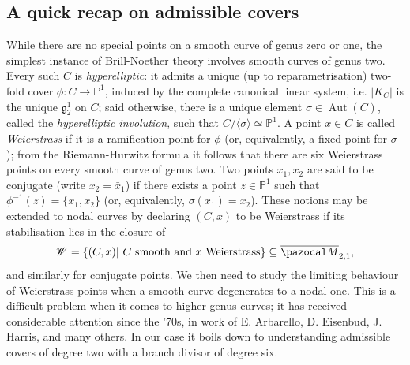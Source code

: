 \documentclass{compositio}
\newcommand{\PP}{\mathbb P}
\renewcommand{\to}{\rightarrow}
\newcommand{\oM}{\overline{\pazocal M}}
\newcommand{\Aut}{\operatorname{Aut}}
\theoremstyle{plain}
\theoremstyle{definition}
\theoremstyle{remark}
\begin{document}
\subsection{A quick recap on admissible covers}\label{rmk:Wandconj}
 While there are no special points on a smooth curve of genus zero or one, the simplest instance of Brill-Noether theory involves smooth curves of genus two. Every such $C$ is \emph{hyperelliptic}: it admits a unique (up to reparametrisation) two-fold cover $\phi\colon C\to\PP^1$, induced by the complete canonical linear system, i.e. $\lvert K_C\rvert$ is the unique $\mathfrak g^1_2$ on $C$; said otherwise, there is a unique element $\sigma\in\Aut(C)$, called the \emph{hyperelliptic involution}, such that $C/\langle\sigma\rangle\simeq\PP^1$. A point $x\in C$ is called \emph{Weierstrass} if it is a ramification point for $\phi$ (or, equivalently, a fixed point for $\sigma$); from the Riemann-Hurwitz formula it follows that there are six Weierstrass points on every smooth curve of genus two. Two points $x_1,x_2$ are said to be conjugate (write $x_2=\bar x_1$) if there exists a point $z\in\PP^1$ such that $\phi^{-1}(z)=\{x_1,x_2\}$ (or, equivalently, $\sigma(x_1)=x_2$). These notions may be extended to nodal curves by declaring $(C,x)$ to be Weierstrass if its stabilisation lies in the closure of
 \[\mathcal W=\{(C,x)|\ C\text{ smooth and } x \text{ Weierstrass}\}\subseteq\oM_{2,1},\]
 and similarly for conjugate points. We then need to study the limiting behaviour of Weierstrass points when a smooth curve degenerates to a nodal one. This is a difficult problem when it comes to higher genus curves; it has received considerable attention since the '70s, in work of E. Arbarello, D. Eisenbud, J. Harris, and many others. In our case it boils down to understanding admissible covers \cite{HarrisMumford} of degree two with a branch divisor of degree six. 
 
\end{document}
